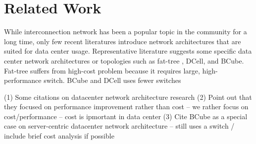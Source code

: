 \section{Related Work}
\label{sec:related}

While interconnection network has been a popular topic in the community for a long time\cite{datacenter3}, only few recent literatures introduce network architectures that are suited for data center usage. Representative literature suggests some specific data center network architectures or topologies such as fat-tree \cite{Al-Fares:2008:SCD, datacenter4}, DCell\cite{datacenter2}, and BCube\cite{datacenter5}. 
Fat-tree suffers from high-cost problem because it requires large, high-performance switch. BCube and DCell uses fewer switches 


(1) Some citations on datacenter network architecture research
(2) Point out that they focused on performance improvement rather than cost -- we rather focus on cost/performance -- cost is ipmortant in data center
(3) Cite BCube as a special case on server-centric datacenter network architecture  -- still uses a switch / include brief cost analysis if possible

